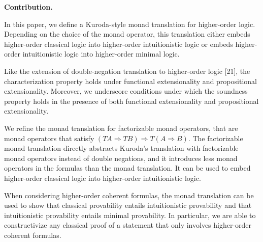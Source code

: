 \documentclass[10pt,a4paper]{article}
\begin{document}
\par\medskip\noindent\textbf{Contribution.}\par
 
 
In this paper, we define a Kuroda-style monad translation for higher-order logic. Depending on the choice of the monad operator, this translation either embeds higher-order classical logic into higher-order intuitionistic logic or embeds higher-order intuitionistic logic into higher-order minimal logic.\par
 
 
 
Like the extension of double-negation translation to higher-order logic [21], the characterization property holds under functional extensionality and propositional extensionality. Moreover, we underscore conditions under which the soundness property holds in the presence of both functional extensionality and propositional extensionality.\par
 
 
 
We refine the monad translation for factorizable monad operators, that are monad operators that satisfy $(TA\mathbin{\Rightarrow}TB)\mathbin{\Rightarrow}T(A\mathbin{\Rightarrow}B)$. The factorizable monad translation directly abstracts Kuroda’s translation with factorizable monad operators instead of double negations, and it introduces less monad operators in the formulas than the monad translation. It can be used to embed higher-order classical logic into higher-order intuitionistic logic.\par
 
 
 
When considering higher-order coherent formulas, the monad translation can be used to show that classical provability entails intuitionistic provability and that intuitionistic provability entails minimal provability. In particular, we are able to constructivize any classical proof of a statement that only involves higher-order coherent formulas.\par
 
 
 
\end{document}

